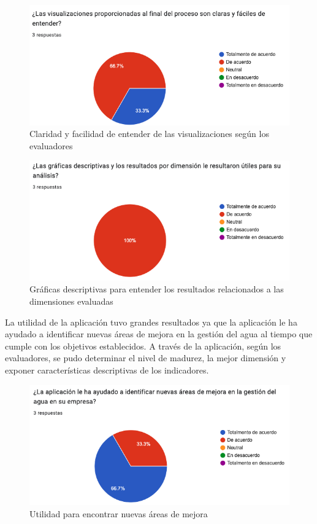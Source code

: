 \begin{figure}[H]
        \centering
        \includegraphics[scale=0.45]{images/6-validacion/9-vf.png}
        \caption{Claridad y facilidad de entender de las visualizaciones según los evaluadores}
\end{figure}
    
\begin{figure}[H]
        \centering
        \includegraphics[scale=0.45]{images/6-validacion/10-vf.png}
        \caption{Gráficas descriptivas para entender los resultados relacionados a las dimensiones evaluadas}
\end{figure}

 

La utilidad de la aplicación tuvo grandes resultados ya que la aplicación le ha ayudado a identificar nuevas áreas de mejora en la gestión del agua al tiempo que cumple con los objetivos establecidos.  A través de la aplicación, según los evaluadores, se pudo determinar el nivel de madurez, la mejor dimensión y exponer características descriptivas de los indicadores.

\begin{figure}[H]
        \centering
        \includegraphics[scale=0.45]{images/6-validacion/11-utilidad.png}
        \caption{Utilidad para encontrar nuevas áreas de mejora}
\end{figure}

